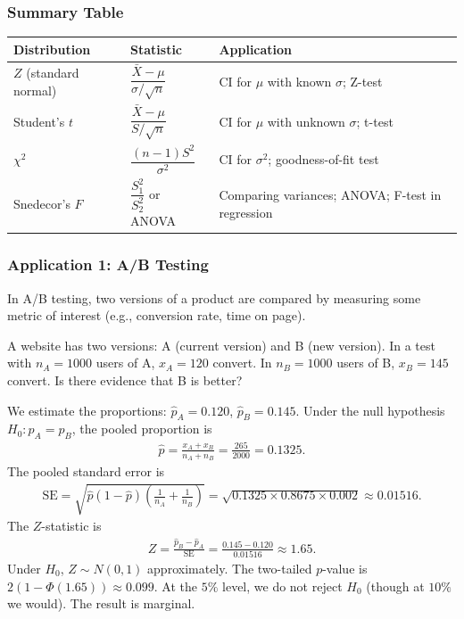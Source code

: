 \subsubsection{Summary Table}

\begin{center}
\begin{tabular}{|l|l|l|}
\hline
\textbf{Distribution} & \textbf{Statistic} & \textbf{Application} \\
\hline
$Z$ (standard normal) & $\dfrac{\bar{X}-\mu}{\sigma/\sqrt{n}}$
& CI for $\mu$ with known $\sigma$; Z-test \\
\hline
Student's $t$ & $\dfrac{\bar{X}-\mu}{S/\sqrt{n}}$
& CI for $\mu$ with unknown $\sigma$; t-test \\
\hline
$\chi^2$ & $\dfrac{(n-1)S^2}{\sigma^2}$
& CI for $\sigma^2$; goodness-of-fit test \\
\hline
Snedecor's $F$ & $\dfrac{S_1^2}{S_2^2}$ or ANOVA
& Comparing variances; ANOVA; F-test in regression \\
\hline
\end{tabular}
\end{center}

\subsubsection{Application 1: A/B Testing}

In A/B testing, two versions of a product are compared by measuring some metric of interest (e.g., conversion rate, time on page).

\begin{ejemplo}
 \label{exmp:3.2.7}
A website has two versions: A (current version) and B (new version). In a test with $n_A = 1000$ users of A, $x_A = 120$ convert. In $n_B = 1000$ users of B, $x_B = 145$ convert. Is there evidence that B is better?
\end{ejemplo}

\begin{solucion}
We estimate the proportions: $\hat{p}_A = 0.120$, $\hat{p}_B = 0.145$. Under the null hypothesis $H_0: p_A = p_B$, the pooled proportion is
\begin{align}
 \hat{p} = \frac{x_A + x_B}{n_A + n_B} = \frac{265}{2000} = 0.1325.
\end{align}
The pooled standard error is
\begin{align}
 \text{SE} = \sqrt{\hat{p}(1-\hat{p})\left(\frac{1}{n_A} + \frac{1}{n_B}\right)}
 = \sqrt{0.1325 \times 0.8675 \times 0.002} \approx 0.01516.
\end{align}
The $Z$-statistic is
\begin{align}
 Z = \frac{\hat{p}_B - \hat{p}_A}{\text{SE}} = \frac{0.145 - 0.120}{0.01516} \approx 1.65.
\end{align}
Under $H_0$, $Z \sim N(0,1)$ approximately. The two-tailed $p$-value is $2(1 - \Phi(1.65)) \approx 0.099$. At the $5\%$ level, we do not reject $H_0$ (though at $10\%$ we would). The result is marginal.
\end{solucion}

